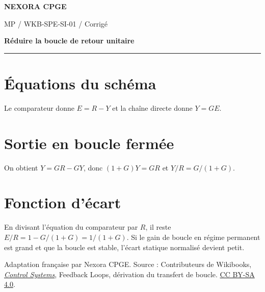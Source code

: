 \documentclass[11pt,a4paper]{article}
\begin{document}
{\small\bfseries\color{nexorablue} NEXORA CPGE}\par
{\small MP / WKB-SPE-SI-01 / Corrigé}\par
{\LARGE\bfseries Réduire la boucle de retour unitaire}\par
\vspace{0.25em}\hrule\vspace{0.6em}

\section*{Équations du schéma}
Le comparateur donne $E=R-Y$ et la chaîne directe donne $Y=GE$.

\section*{Sortie en boucle fermée}
On obtient $Y=GR-GY$, donc $(1+G)Y=GR$ et $Y/R=G/(1+G)$.

\section*{Fonction d’écart}
En divisant l’équation du comparateur par $R$, il reste $E/R=1-G/(1+G)=1/(1+G)$. Si le gain de boucle en régime permanent est grand et que la boucle est stable, l’écart statique normalisé devient petit.

\bigskip
{\footnotesize Adaptation française par Nexora CPGE. Source : Contributeurs de Wikibooks,
\href{https://en.wikibooks.org/wiki/Control_Systems/Feedback_Loops\#Feedback_Loop_Transfer_Function}{\textit{Control Systems}}, Feedback Loops, dérivation du transfert de boucle.
\href{https://creativecommons.org/licenses/by-sa/4.0/}{CC BY-SA 4.0}.}
\end{document}
